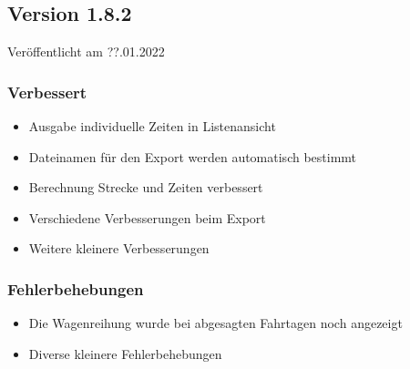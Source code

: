 \begin{neu}
\subsection{Version 1.8.2}
\label{version:1:8:2}
Veröffentlicht am ??.01.2022
\subsubsection{Verbessert}
\begin{itemize}
  \item
  Ausgabe individuelle Zeiten in Listenansicht
  \item
  Dateinamen für den Export werden automatisch bestimmt
  \item
  Berechnung Strecke und Zeiten verbessert
  \item
  Verschiedene Verbesserungen beim Export
  \item
  Weitere kleinere Verbesserungen
\end{itemize}

\subsubsection{Fehlerbehebungen}
\begin{itemize}
  \item
  Die Wagenreihung wurde bei abgesagten Fahrtagen noch angezeigt
  \item
  Diverse kleinere Fehlerbehebungen
\end{itemize}
\end{neu}
